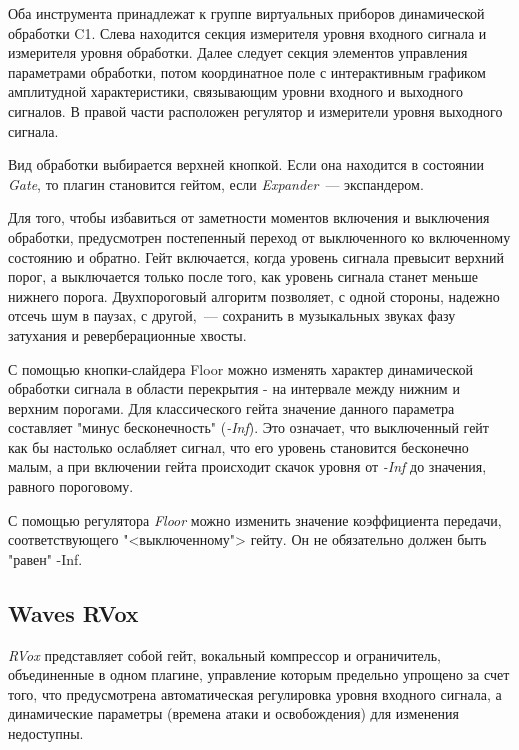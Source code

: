 \documentclass[oneside, final, 14pt]{extreport}
\begin{document}
Оба инструмента принадлежат к группе виртуальных приборов динамической обработки C1. Слева находится секция измерителя уровня входного сигнала и измерителя уровня обработки. Далее следует секция элементов управления параметрами обработки, потом координатное поле с интерактивным графиком амплитудной характеристики, связывающим уровни входного и выходного сигналов. В правой части расположен регулятор и измерители уровня выходного сигнала.

Вид обработки выбирается верхней кнопкой. Если она находится в состоянии \emph{Gate}, то плагин становится гейтом, если \emph{Expander}~--- экспандером.

Для того, чтобы избавиться от заметности моментов включения и выключения обработки, предусмотрен постепенный переход от выключенного ко включенному состоянию и обратно. Гейт включается, когда уровень сигнала превысит верхний порог, а выключается только после того, как уровень сигнала станет меньше нижнего порога. Двухпороговый алгоритм позволяет, с одной стороны, надежно отсечь шум в паузах, с другой,~--- сохранить в музыкальных звуках фазу затухания и реверберационные хвосты.

С помощью кнопки-слайдера Floor можно изменять характер динамической обработки сигнала в области перекрытия - на интервале между нижним и верхним порогами. Для классического гейта значение данного параметра составляет "минус бесконечность" (\emph{-Inf}). Это означает, что выключенный гейт как бы настолько ослабляет сигнал, что его уровень становится бесконечно малым, а при включении гейта происходит скачок уровня от \emph{-Inf} до значения, равного пороговому. 

С помощью регулятора \emph{Floor} можно изменить значение коэффициента передачи, соответствующего "<выключенному"> гейту. Он не обязательно должен быть "равен" -Inf.
 
\subsection{Waves RVox}
\emph{RVox} представляет собой гейт, вокальный компрессор и ограничитель, объединенные в одном плагине, управление которым предельно упрощено за счет того, что предусмотрена автоматическая регулировка уровня входного сигнала, а динамические параметры (времена атаки и освобождения) для изменения недоступны.
\end{document}
